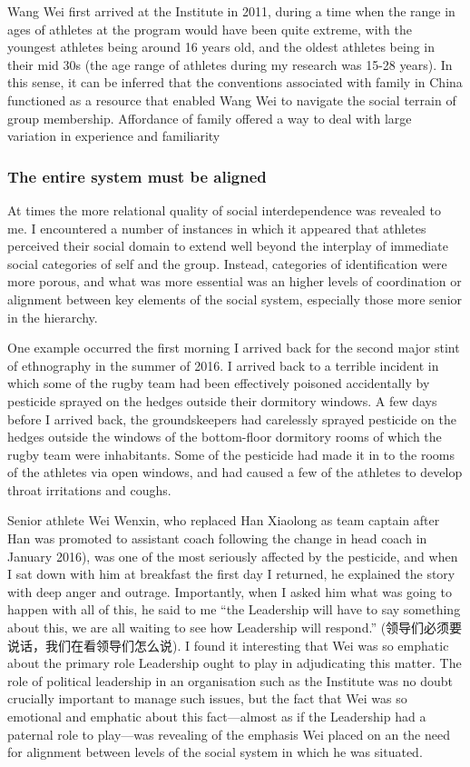 \begin{CJK}{UTF8}{gbsn}
Wang Wei first arrived at the Institute in 2011, during a time when the range in ages of athletes at the program would have been quite extreme, with the youngest athletes being around 16 years old, and the oldest athletes being in their mid 30s (the age range of athletes during my research was 15-28 years).  In this sense, it can be inferred that the conventions associated with family in China functioned as a resource that enabled Wang Wei to navigate the social terrain of group membership.  Affordance of family offered a way to deal with large variation in experience and familiarity




\subsubsection{The entire system must be aligned \label{sect:systemAligned}}

At times the more relational quality of social interdependence was revealed to me. I encountered a number of instances in which it appeared that athletes perceived their social domain to extend well beyond the interplay of immediate social categories of self and the group.  Instead, categories of identification were more porous, and what was more essential was an higher levels of coordination or alignment between key elements of the social system, especially those more senior in the hierarchy.

One example occurred the first morning I arrived back for the second major stint of ethnography in the summer of 2016.  I arrived back to a terrible incident in which some of the rugby team had been effectively poisoned accidentally by pesticide sprayed on the hedges outside their dormitory windows.  A few days before I arrived back, the groundskeepers had carelessly sprayed pesticide on the hedges outside the windows of the bottom-floor dormitory rooms of which the rugby team were inhabitants.  Some of the pesticide had made it in to the rooms of the athletes via open windows, and had caused a few of the athletes to develop throat irritations and coughs.

Senior athlete Wei Wenxin, who replaced Han Xiaolong as team captain after Han was promoted to assistant coach following the change in head coach in January 2016), was one of the most seriously affected by the pesticide, and when I sat down with him at breakfast the first day I returned, he explained the story with deep anger and outrage.  Importantly, when I asked him what was going to happen with all of this, he said to me ``the Leadership will have to say something about this, we are all waiting to see how Leadership will respond.'' (领导们必须要说话，我们在看领导们怎么说).  I found it interesting that Wei was so emphatic about the primary role Leadership ought to play in adjudicating this matter.  The role of political leadership in an organisation such as the Institute was no doubt crucially important to manage such issues, but the fact that Wei was so emotional and emphatic about this fact---almost as if the Leadership had a paternal role to play---was revealing of the emphasis Wei placed on an the need for alignment between levels of the social system in which he was situated.


\end{CJK}
